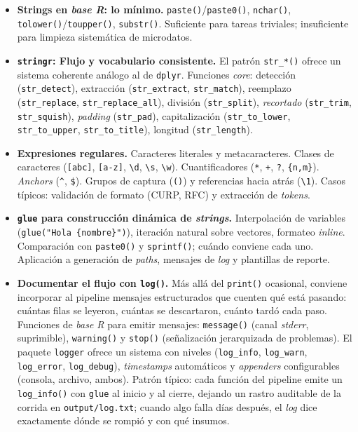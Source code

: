 \documentclass[11pt,letterpaper]{article}
\newcommand{\blue}[1]{{\color{cerulean}#1}}
\begin{document}
\begin{itemize}[leftmargin=*, itemsep=2pt]
    \item \textbf{Strings en \textit{base R}: lo mínimo.} \texttt{paste()}/\texttt{paste0()}, \texttt{nchar()}, \texttt{tolower()}/\texttt{toupper()}, \texttt{substr()}. Suficiente para tareas triviales; insuficiente para limpieza sistemática de microdatos.
    \item \textbf{\texttt{stringr}: Flujo y vocabulario consistente.} El patrón \texttt{str\_*()} ofrece un sistema coherente análogo al de \texttt{dplyr}. Funciones \textit{core}: detección (\texttt{str\_detect}), extracción (\texttt{str\_extract}, \texttt{str\_match}), reemplazo (\texttt{str\_replace}, \texttt{str\_replace\_all}), división (\texttt{str\_split}), \textit{recortado} (\texttt{str\_trim}, \texttt{str\_squish}), \textit{padding} (\texttt{str\_pad}), capitalización (\texttt{str\_to\_lower}, \texttt{str\_to\_upper}, \texttt{str\_to\_title}), longitud (\texttt{str\_length}).
    \item \textbf{Expresiones regulares.} Caracteres literales y metacaracteres. Clases de caracteres (\texttt{[abc]}, \texttt{[a-z]}, \texttt{\textbackslash d}, \texttt{\textbackslash s}, \texttt{\textbackslash w}). Cuantificadores (\texttt{*}, \texttt{+}, \texttt{?}, \texttt{\{n,m\}}). \textit{Anchors} (\texttt{\textasciicircum}, \texttt{\$}). Grupos de captura (\texttt{()}) y referencias hacia atrás (\texttt{\textbackslash 1}). Casos típicos: validación de formato (CURP, RFC) y extracción de \textit{tokens}.
    \item \textbf{\texttt{glue} para construcción dinámica de \textit{strings}.} Interpolación de variables (\texttt{glue("Hola \{nombre\}")}), iteración natural sobre vectores, formateo \textit{inline}. Comparación con \texttt{paste0()} y \texttt{sprintf()}; cuándo conviene cada uno. Aplicación a generación de \textit{paths}, mensajes de \textit{log} y plantillas de reporte.
    \item \textbf{Documentar el flujo con \texttt{log()}.} Más allá del \texttt{print()} ocasional, conviene incorporar al pipeline mensajes estructurados que cuenten qué está pasando: cuántas filas se leyeron, cuántas se descartaron, cuánto tardó cada paso. \blue{Funciones de \textit{base R}} para emitir mensajes: \texttt{message()} (canal \textit{stderr}, suprimible), \texttt{warning()} y \texttt{stop()} (señalización jerarquizada de problemas). El paquete \texttt{logger} ofrece un sistema con niveles (\texttt{log\_info}, \texttt{log\_warn}, \texttt{log\_error}, \texttt{log\_debug}), \textit{timestamps} automáticos y \textit{appenders} configurables (consola, archivo, ambos). \blue{Patrón típico}: cada función del pipeline emite un \texttt{log\_info()} con \texttt{glue} al inicio y al cierre, dejando un rastro auditable de la corrida en \texttt{output/log.txt}; cuando algo falla días después, el \textit{log} dice exactamente dónde se rompió y con qué insumos.

\end{itemize}
\end{document}
